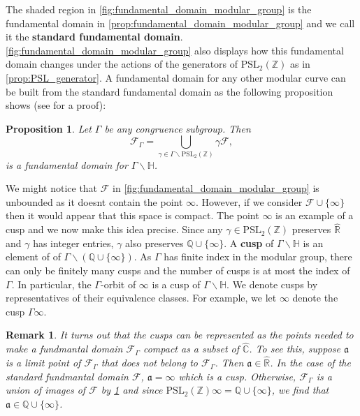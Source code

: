 \documentclass[12pt]{book}
\newtheorem{proposition}{Proposition}[section]
\newtheorem{remark}{Remark}[section]
\theoremstyle{definition}\newframedtheorem{method}{Method}
\newcommand{\mf}{\mathfrak}
\newcommand{\mc}{\mathcal}
\newcommand{\PSL}{\mathrm{PSL}}
\newcommand{\Z}{\mathbb{Z}}
\newcommand{\Q}{\mathbb{Q}}
\newcommand{\R}{\mathbb{R}}
\newcommand{\C}{\mathbb{C}}
\renewcommand{\H}{\mathbb{H}}
\newcommand{\g}{\gamma}
\newcommand{\G}{\Gamma}
\newcommand{\<}{\langle}
\renewcommand{\>}{\rangle}
\newcommand{\GH}{\G\backslash\H}
\begin{document}
      The shaded region in \cref{fig:fundamental_domain_modular_group} is the fundamental domain in \cref{prop:fundamental_domain_modular_group} and we call it the \textbf{standard fundamental domain}. \cref{fig:fundamental_domain_modular_group} also displays how this fundamental domain changes under the actions of the generators of $\PSL_{2}(\Z)$ as in \cref{prop:PSL_generator}. A fundamental domain for any other modular curve can be built from the standard fundamental domain as the following proposition shows (see \cite{kilford2015modular} for a proof):

      \begin{proposition}\label{prop:fundamental_domain_congruence_subgroup}
        Let $\G$ be any congruence subgroup. Then
        \[
          \mc{F}_{\G} = \bigcup_{\g \in \G\backslash\PSL_{2}(\Z)}\g\mc{F},
        \]
        is a fundamental domain for $\G\backslash\H$.
      \end{proposition}

      We might notice that $\mc{F}$ in \cref{fig:fundamental_domain_modular_group} is unbounded as it doesnt contain the point $\infty$. However, if we consider $\mc{F} \cup \{\infty\}$ then it would appear that this space is compact. The point $\infty$ is an example of a cusp and we now make this idea precise. Since any $\g \in \PSL_{2}(\Z)$ preserves $\hat{\R}$ and $\g$ has integer entries, $\g$ also preserves $\Q \cup \{\infty\}$. A \textbf{cusp} of $\GH$ is an element of of $\G\backslash(\Q \cup \{\infty\})$. As $\G$ has finite index in the modular group, there can only be finitely many cusps and the number of cusps is at most the index of $\G$. In particular, the $\G$-orbit of $\infty$ is a cusp of $\GH$. We denote cusps by representatives of their equivalence classes. For example, we let $\infty$ denote the cusp $\G\infty$.

      \begin{remark}
        It turns out that the cusps can be represented as the points needed to make a fundmantal domain $\mc{F}_{\G}$ compact as a subset of $\hat{\C}$. To see this, suppose $\mf{a}$ is a limit point of $\mc{F}_{\G}$ that does not belong to $\mc{F}_{\G}$. Then $\mf{a} \in \hat{\R}$. In the case of the standard fundmantal domain $\mc{F}$, $\mf{a} = \infty$ which is a cusp. Otherwise, $\mc{F}_{\G}$ is a union of images of $\mc{F}$ by \cref{prop:fundamental_domain_congruence_subgroup} and since $\PSL_{2}(\Z)\infty = \Q \cup \{\infty\}$, we find that $\mf{a} \in \Q \cup \{\infty\}$.
      \end{remark}
\end{document}
